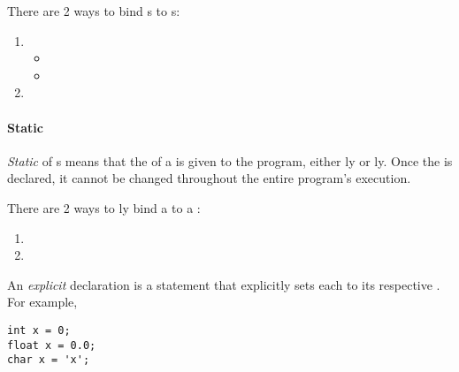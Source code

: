 There are 2 ways to bind s to s:
\begin{enumerate}[noitemsep]
\item {}
  \begin{itemize}[noitemsep]
  \item {}
  \item {}
  \end{itemize}
\item {}
\end{enumerate}

\paragraph{Static  }\label{par:Static_Variable_Type_Binding}
\begin{definition}[Static]\label{def:Static_Variable_Type_Binding}
  \emph{Static}  of s means that the  of a  is given to the program, either ly or ly.
  Once the  is declared, it cannot be changed throughout the entire program's execution.

  There are 2 ways to ly bind a  to a :
  \begin{enumerate}[noitemsep]
  \item {}
  \item {}
  \end{enumerate}
\end{definition}

\begin{definition}[Explicit]\label{def:Explicit_Static_Variable_Type_Binding}
  An \emph{explicit} declaration is a statement that explicitly sets each  to its respective .
  For example,
\begin{verbatim}
int x = 0;
float x = 0.0;
char x = 'x';
\end{verbatim}
\end{definition}

